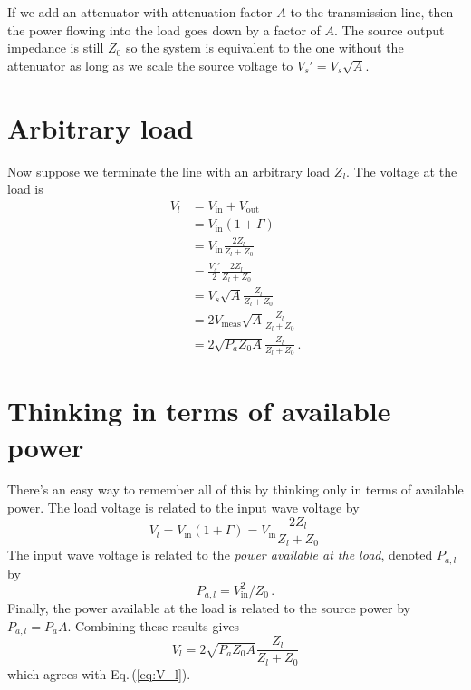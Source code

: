\documentclass[twocolumn]{article}
\begin{document}
If we add an attenuator with attenuation factor $A$ to the transmission line, then the power flowing into the load goes down by a factor of $A$.
The source output impedance is still $Z_0$ so the system is equivalent to the one without the attenuator as long as we scale the source voltage to $V_s'=V_s \sqrt{A}$.

\section{Arbitrary load}

Now suppose we terminate the line with an arbitrary load $Z_l$.
The voltage at the load is
\begin{align}
V_l
&= V_{\text{in}} + V_{\text{out}} \\
&= V_{\text{in}} (1 + \Gamma) \\
&= V_{\text{in}} \frac{2 Z_l}{Z_l + Z_0} \\
&= \frac{V_s'}{2} \frac{2 Z_l}{Z_l + Z_0} \\
&= V_s \sqrt{A} \frac{Z_l}{Z_l + Z_0} \\
&= 2 V_{\text{meas}} \sqrt{A} \frac{Z_l}{Z_l + Z_0} \\
&= 2 \sqrt{P_a Z_0 A} \frac{Z_l}{Z_l + Z_0} \, . \label{eq:V_l}
\end{align}

\section{Thinking in terms of available power}

There's an easy way to remember all of this by thinking only in terms of available power.
The load voltage is related to the input wave voltage by
\begin{equation}
V_l = V_{\text{in}}(1 + \Gamma) = V_{\text{in}} \frac{2 Z_l}{Z_l + Z_0} \,
\end{equation}
The input wave voltage is related to the \emph{power available at the load}, denoted $P_{a,l}$ by
\begin{equation}
P_{a,l} = V_{\text{in}}^2 / Z_0 \, .
\end{equation}
Finally, the power available at the load is related to the source power by $P_{a,l} = P_a A$.
Combining these results gives
\begin{equation}
V_l = 2 \sqrt{P_a Z_0 A} \frac{Z_l}{Z_l + Z_0}
\end{equation}
which agrees with Eq.\,(\ref{eq:V_l}).
\end{document}
